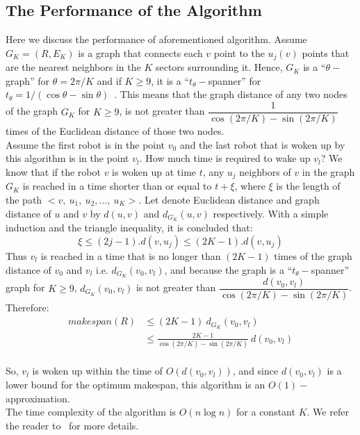 \documentclass{cccg12}
\begin{document}
\subsection{The Performance of the Algorithm}
Here we discuss the performance of aforementioned algorithm. Assume ${ G_K=(R,E_K) }$ is a graph that connects each $v$ point to the $u_j(v)$ points that are the nearest neighbors in the $K$ sectors surrounding it. Hence, $G_K$ is a 
``$\theta-$graph'' for ${ \theta=2\pi/K }$ and if ${ K\geq 9 }$, it is a ``$t_\theta-$spanner'' for
${ t_\theta=1/(\cos\theta-\sin\theta) }$~\cite{Keil1992}.
This means that the graph distance of any two nodes of the graph $G_K$ for ${ K\geq 9 }$, is not greater than
{\small${ \dfrac{1}{\cos(2\pi/K)-\sin(2\pi/K)} }$}
times of the Euclidean distance of those two nodes. \\
Assume the first robot is in the point $v_0$ and the last robot that is woken up by this algorithm is in the point $v_l$. How much time is required to wake up $v_l$? We know that if the robot $v$ is woken up at time $t$, any $u_j$ neighbors of $v$ in the graph $G_K$ is reached in a time shorter than or equal to ${ t+\xi }$, where $\xi$ is the length of the path ${ <v,~u_1,~u_2,...,~u_K> }$. Let denote Euclidean distance and graph distance of $u$ and $v$ by ${ d(u,v) }$ and ${ d_{G_K}(u,v) }$ respectively. With a simple induction and the triangle inequality, it is concluded that:
{\small$$ \xi \leq (2j-1).d(v,u_j ) \leq (2K-1).d(v,u_j ) $$}
Thus $v_l$ is reached in a time that is no longer than ${ (2K-1) }$ times of the graph distance of $v_0$ and $v_l$ i.e. ${ d_{G_K}(v_0,v_l) }$, and because the graph is a ``$t_\theta-$spanner'' graph for ${ K\geq 9 }$, ${ d_{G_K}(v_0,v_l) }$ is not greater than
{\small${ \dfrac{d(v_0,v_l)}{\cos(2\pi/K)-\sin(2\pi/K)} }$}.
Therefore:\\
{\small\begin{align}
makespan(R)	&\leq (2K-1)~d_{G_K}(v_0,v_l) \nonumber\\
			&\leq \frac{2K-1}{\cos(2\pi/K)-\sin(2\pi/K)}~d(v_0,v_l) \nonumber
\end{align}}
\\
So, $v_l$ is woken up within the time of ${ O(d(v_0,v_l)) }$, and since ${ d(v_0,v_l) }$ is a lower bound for the optimum makespan, this algorithm is an ${ O(1)- }$approximation. \\
The time complexity of the algorithm is ${ O(n\log n) }$ for a constant $K$. We refer the reader to~\cite{Arkin2006} for more details.
\end{document}

